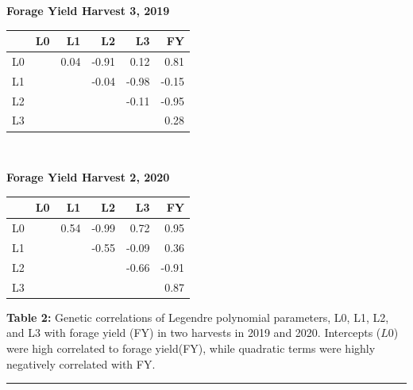 \documentclass[10pt, letterpaper]{article}
\begin{document}
\noindent%
\begin{minipage}[h]{.45\textwidth}
\centering
\textbf{ Forage Yield Harvest 3, 2019}

\medskip
\begin{tabular}{rrrrrr}
 & L0 & L1 & L2 & L3 & FY \\ 
  \hline
  L0 &  & 0.04 & -0.91 & 0.12 & 0.81 \\ 
  L1 & &  & -0.04 & -0.98 & -0.15 \\ 
  L2 & & &  & -0.11 & -0.95 \\ 
  L3 & & & &  & 0.28 \\ 
   \hline
\end{tabular}
\end{minipage}%
\begin{minipage}[h]{.05\textwidth}
\
\end{minipage}%
\begin{minipage}[h]{.45\textwidth}
\centering
\textbf{Forage Yield Harvest 2, 2020}

\medskip
\begin{tabular}{rrrrrr}
 & L0 & L1 & L2 & L3 & FY \\ 
  \hline
  L0 &   & 0.54 & -0.99 & 0.72 & 0.95 \\ 
  L1 & &   & -0.55 & -0.09 & 0.36 \\ 
  L2 & & &   & -0.66 & -0.91 \\ 
  L3 & & & &   & 0.87 \\ 
   \hline
\end{tabular}
\end{minipage}%

\smallskip

\noindent \textbf{Table 2:} Genetic correlations of Legendre polynomial parameters, L0, L1, L2, and L3 with forage yield (FY) in two harvests in 2019 and 2020. Intercepts ($L0$) were high correlated to forage yield(FY), while quadratic terms were highly negatively correlated with FY.


\noindent \rule{\linewidth}{0.1pt}
\smallskip
\end{document}

